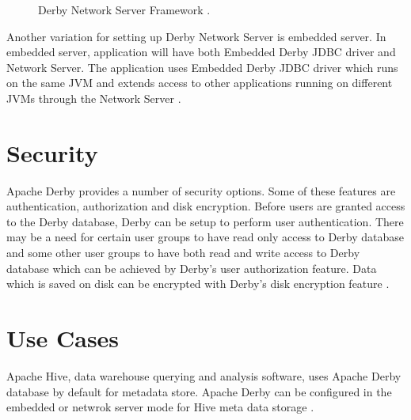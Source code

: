 \documentclass[9pt,twocolumn,twoside]{../../styles/osajnl}
\begin{document}
\begin{figure}[htbp]
\caption{Derby Network Server Framework  \cite {www-derbytutorial}.}
\end{figure}

Another variation for setting up Derby Network Server is embedded
server. In embedded server, application will have both Embedded Derby
JDBC driver and Network Server. The application uses Embedded Derby
JDBC driver which runs on the same JVM and extends access to other
applications running on different JVMs through the Network Server
\cite {www-derbytutorial}.

\section{Security}

Apache Derby provides a number of security options. Some of these
features are authentication, authorization and disk encryption.
Before users are granted access to the Derby database, Derby can be
setup to perform user authentication. There may be a need for certain
user groups to have read only access to Derby database and some other
user groups to have both read and write access to Derby database which
can be achieved by Derby's user authorization feature. Data which is
saved on disk can be encrypted with Derby's disk encryption feature
\cite {www-derbysec}.

\section{Use Cases}

Apache Hive, data warehouse querying and analysis software, uses
Apache Derby database by default for metadata store.  Apache Derby can
be configured in the embedded or netwrok server mode for Hive meta
data storage \cite {www-hive, www-hivemetastore}.
\end{document}
